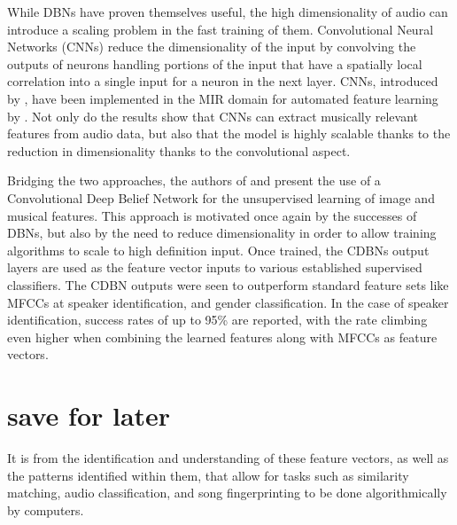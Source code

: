 \documentclass[twoside]{article}
\begin{document}
\begin{multicols}{2}
While DBNs have proven themselves useful, the high dimensionality of audio can introduce a scaling problem in the fast training of them. Convolutional Neural Networks (CNNs) reduce the dimensionality of the input by convolving the outputs of neurons handling portions of the input that have a spatially local correlation into a single input for a neuron in the next layer. CNNs, introduced by \citet{atlas1988artificial}, have been implemented in the MIR domain for automated feature learning by \citet{li2010automatic}. Not only do the results show that CNNs can extract musically relevant features from audio data, but also that the model is highly scalable thanks to the reduction in dimensionality thanks to the convolutional aspect.

Bridging the two approaches, the authors of \citet{lee2009convolutional} and \citet{lee2009unsupervised} present the use of a Convolutional Deep Belief Network for the unsupervised learning of image and musical features. This approach is motivated once again by the successes of DBNs, but also by the need to reduce dimensionality in order to allow training algorithms to scale to high definition input. Once trained, the CDBNs output layers are used as the feature vector inputs to various established supervised classifiers. The CDBN outputs were seen to outperform standard feature sets like MFCCs at speaker identification, and gender classification. In the case of speaker identification, success rates of up to 95\% are reported, with the rate climbing even higher when combining the learned features along with MFCCs as feature vectors.



\section{save for later}
It is from the identification and understanding of these feature vectors, as well as the patterns identified within them, that allow for tasks such as similarity matching, audio classification, and song fingerprinting to be done algorithmically by computers.

{}


% 


\end{multicols}
\end{document}
